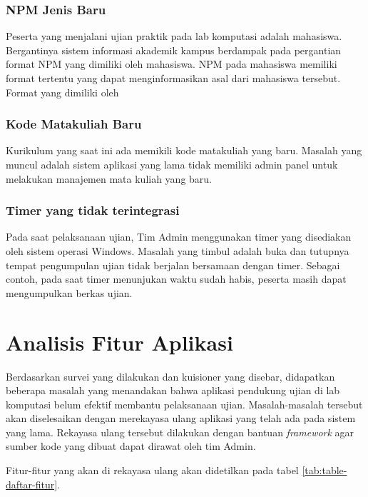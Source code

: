     \subsubsection{NPM Jenis Baru}\label{ref-prob-admin-npm-baru} Peserta yang
    menjalani ujian praktik pada lab komputasi adalah mahasiswa. Bergantinya
    sistem informasi akademik kampus berdampak pada pergantian format NPM yang
    dimiliki oleh mahasiswa. NPM pada mahasiswa memiliki format tertentu yang
    dapat menginformasikan asal dari mahasiswa tersebut. Format yang dimiliki
    oleh 
    
    \subsubsection{Kode Matakuliah Baru}\label{ref-prob-admin-kode-mk-baru}
    Kurikulum yang saat ini ada memikili kode matakuliah yang baru. Masalah yang
    muncul adalah sistem aplikasi yang lama tidak memiliki admin panel untuk
    melakukan manajemen mata kuliah yang baru.
    
    \subsubsection{Timer yang tidak
    terintegrasi}\label{ref-prob-admin-timer-integrated} Pada saat pelaksanaan
    ujian, Tim Admin menggunakan timer yang disediakan oleh sistem operasi
    Windows. Masalah yang timbul adalah buka dan tutupnya tempat pengumpulan
    ujian tidak berjalan bersamaan dengan timer. Sebagai contoh, pada saat timer
    menunjukan waktu sudah habis, peserta masih dapat mengumpulkan berkas ujian.
    
    
\section{Analisis Fitur Aplikasi}
    Berdasarkan survei yang dilakukan dan kuisioner yang disebar, didapatkan
    beberapa masalah yang menandakan bahwa aplikasi pendukung ujian di lab
    komputasi belum efektif membantu pelaksanaan ujian. Masalah-masalah tersebut
    akan diselesaikan dengan merekayasa ulang aplikasi yang telah ada pada
    sistem yang lama. Rekayasa ulang tersebut dilakukan dengan bantuan
    \textit{framework} agar sumber kode yang dibuat dapat dirawat oleh tim
    Admin.
    
    Fitur-fitur yang akan di rekayasa ulang akan didetilkan pada tabel \ref{tab:table-daftar-fitur}.
    

